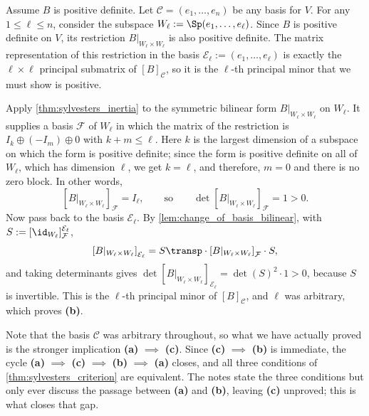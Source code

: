 \begin{exercisesolution}
\label{sol:sylvester_criterion_forward}
Assume $B$ is positive definite. Let $\mathcal{C} = (e_1, \dots, e_n)$ be any basis for $V$. For any $1 \le \ell \le n$, consider the subspace $W_\ell := \Sp(e_1, \dots, e_\ell)$. Since $B$ is positive definite on $V$, its restriction $B|_{W_\ell \times W_\ell}$ is also positive definite. The matrix representation of this restriction in the basis $\mathcal{E}_\ell := (e_1, \dots, e_\ell)$ is exactly the $\ell \times \ell$ principal submatrix of $[B]_{\mathcal{C}}$, so it is the $\ell$-th principal minor that we must show is positive.

Apply \cref{thm:sylvesters_inertia} to the symmetric bilinear form $B|_{W_\ell \times W_\ell}$ on $W_\ell$. It supplies a basis $\mathcal{F}$ of $W_\ell$ in which the matrix of the restriction is $I_k \oplus (-I_m) \oplus 0$ with $k + m \le \ell$. Here $k$ is the largest dimension of a subspace on which the form is positive definite; since the form is positive definite on all of $W_\ell$, which has dimension $\ell$, we get $k = \ell$, and therefore, $m = 0$ and there is no zero block. In other words,
\[ \left[B|_{W_\ell \times W_\ell}\right]_{\mathcal{F}} = I_\ell, \qquad \text{so} \qquad \det\left[B|_{W_\ell \times W_\ell}\right]_{\mathcal{F}} = 1 > 0. \]
Now pass back to the basis $\mathcal{E}_\ell$. By \cref{lem:change_of_basis_bilinear}, with $S := [\id_{W_\ell}]_{\mathcal{F}}^{\mathcal{E}_\ell}$,
\[ \left[B|_{W_\ell \times W_\ell}\right]_{\mathcal{E}_\ell} = S\transp \cdot \left[B|_{W_\ell \times W_\ell}\right]_{\mathcal{F}} \cdot S, \]
and taking determinants gives $\det\left[B|_{W_\ell \times W_\ell}\right]_{\mathcal{E}_\ell} = \det(S)^2 \cdot 1 > 0$, because $S$ is invertible. This is the $\ell$-th principal minor of $[B]_{\mathcal{C}}$, and $\ell$ was arbitrary, which proves \textbf{(b)}.

Note that the basis $\mathcal{C}$ was arbitrary throughout, so what we have actually proved is the stronger implication \textbf{(a)} $\implies$ \textbf{(c)}. Since \textbf{(c)} $\implies$ \textbf{(b)} is immediate, the cycle \textbf{(a)} $\implies$ \textbf{(c)} $\implies$ \textbf{(b)} $\implies$ \textbf{(a)} closes, and all three conditions of \cref{thm:sylvesters_criterion} are equivalent. The notes state the three conditions but only ever discuss the passage between \textbf{(a)} and \textbf{(b)}, leaving \textbf{(c)} unproved; this is what closes that gap.
\end{exercisesolution}

